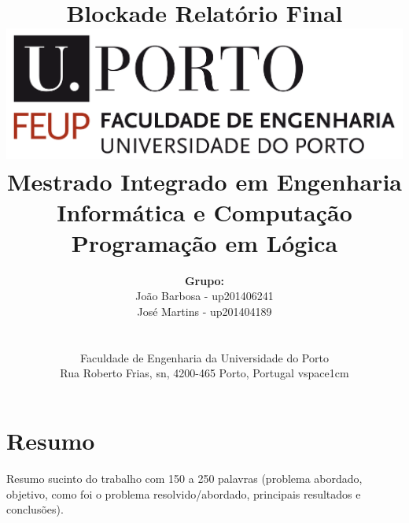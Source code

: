\documentclass[a4paper]{article}
\begin{document}
\setlength{\textwidth}{16cm}
\setlength{\textheight}{22cm}

\title{\Huge\textbf{Blockade}\linebreak\linebreak\linebreak
\Large\textbf{Relatório Final}\linebreak\linebreak
\linebreak\linebreak
\includegraphics[scale=0.1]{feup-logo.png}\linebreak\linebreak
\linebreak\linebreak
\Large{Mestrado Integrado em Engenharia Informática e Computação} \linebreak\linebreak
\Large{Programação em Lógica}\linebreak
}

\author{\textbf{Grupo:}\\  João Barbosa - up201406241 \\ José Martins - up201404189 \\\linebreak\linebreak \\
 \\ Faculdade de Engenharia da Universidade do Porto \\ Rua Roberto Frias, s\/n, 4200-465 Porto, Portugal 
vspace{1cm}}
\maketitle
\thispagestyle{empty}


\newpage

\section*{Resumo}
Resumo sucinto do trabalho com 150 a 250 palavras (problema abordado, objetivo, como foi o problema resolvido/abordado, principais resultados e conclusões).
\end{document}
